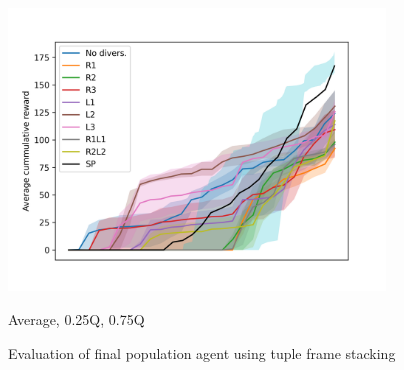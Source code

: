 \begin{figure}[!ht]
    \centering
    \includegraphics*[width=10cm]{../img/FinalPopFinalPopFsTupleAvg.png}

    \caption{Evaluation of final population agent using tuple frame stacking}
    \label{FinalPopFinalPopFsTupleAvg}
    \medskip
    \small 

    Average, 0.25Q, 0.75Q

\end{figure}










